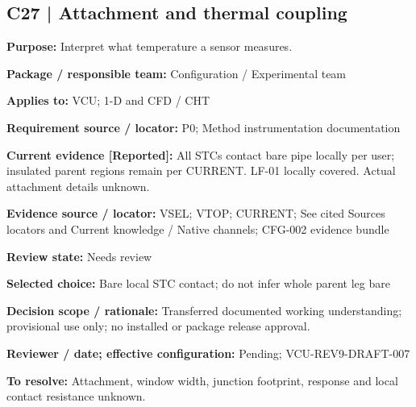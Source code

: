 \documentclass[11pt]{article}
\begin{document}
\par\noindent\begin{minipage}{\textwidth}\small\setlength{\parskip}{2pt}
\subsection*{C27 | Attachment and thermal coupling}
\textbf{Purpose:} Interpret what temperature a sensor measures.\par
\textbf{Package / responsible team:} Configuration / Experimental team\par
\textbf{Applies to:} VCU; 1-D and CFD / CHT\par
\textbf{Requirement source / locator:} P0; Method instrumentation documentation\par
\textbf{Current evidence [Reported]:} All STCs contact bare pipe locally per user; insulated parent regions remain per CURRENT. LF-01 locally covered. Actual attachment details unknown.\par
\textbf{Evidence source / locator:} VSEL; VTOP; CURRENT; See cited Sources locators and Current knowledge / Native channels; CFG-002 evidence bundle\par
\textbf{Review state:} Needs review\par
\textbf{Selected choice:} Bare local STC contact; do not infer whole parent leg bare\par
\textbf{Decision scope / rationale:} Transferred documented working understanding; provisional use only; no installed or package release approval.\par
\textbf{Reviewer / date; effective configuration:} Pending; VCU-REV9-DRAFT-007\par
\textbf{To resolve:} Attachment, window width, junction footprint, response and local contact resistance unknown.\par
\end{minipage}\par\vspace{5pt}
\end{document}
